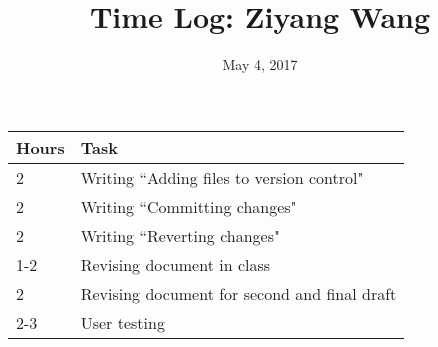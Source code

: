 \documentclass{article}
\title{Time Log: Ziyang Wang}
\date{May 4, 2017}
\begin{document}
\maketitle

\begin{table}[h]
\centering
\label{my-label}
\begin{tabular}{ll}
\textbf{Hours} & \textbf{Task}            \\ \hline
2     & Writing ``Adding files to version control"         \\
2     & Writing ``Committing changes"      \\
2     & Writing ``Reverting changes" \\
1-2   & Revising document in class         \\
2     & Revising document for second and final draft        \\
2-3   & User testing
\end{tabular}
\end{table}
\end{document}
